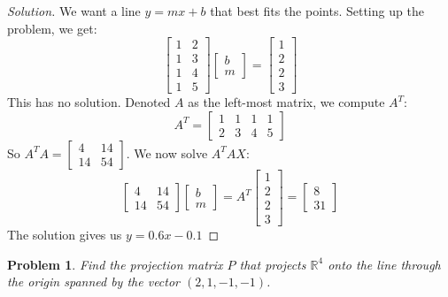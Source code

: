 \documentclass{article}
\theoremstyle{mystyle}
\newtheorem{problem}{Problem}[section]
\begin{document}
\begin{proof}[Solution]
We want a line $y=mx+b$ that best fits the points. Setting up the problem, we get:
\begin{equation*}
    \begin{bmatrix} 1 & 2 \\ 1 & 3 \\ 1 & 4 \\ 1 & 5 \end{bmatrix} \begin{bmatrix} b \\ m \end{bmatrix} = \begin{bmatrix} 1 \\ 2 \\ 2 \\ 3\end{bmatrix}   
\end{equation*}
This has no solution. Denoted $A$ as the left-most matrix, we compute $A^T$:
\begin{equation*}
    A^T = \begin{bmatrix} 1 & 1 & 1 & 1 \\ 2 & 3 & 4 & 5 \end{bmatrix}   
\end{equation*}
So $A^T A = \begin{bmatrix} 4 & 14 \\ 14 & 54 \end{bmatrix}$. We now solve $A^{T}AX$:
\begin{equation*}
    \begin{bmatrix} 4 & 14 \\ 14 & 54 \end{bmatrix} \begin{bmatrix} b \\ m \end{bmatrix} =  A^T \begin{bmatrix} 1 \\ 2 \\ 2 \\ 3 \end{bmatrix} = \begin{bmatrix} 8 \\ 31 \end{bmatrix}   
\end{equation*}
The solution gives us $y = 0.6x-0.1$
\end{proof}
\begin{problem}
Find the projection matrix $P$ that projects $\mathbb{R}^4$ onto the line through the origin spanned by the vector $(2,1,-1,-1)$.
\end{problem}
\end{document}
